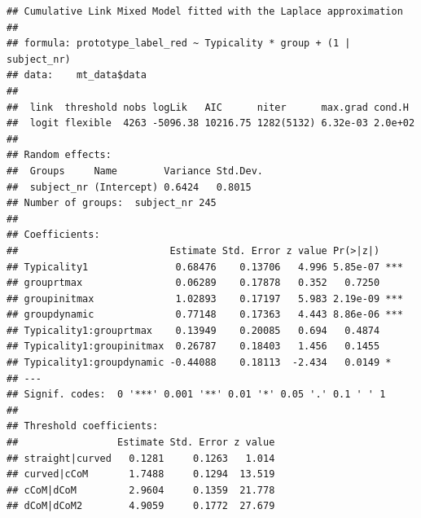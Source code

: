\documentclass[
]{article}
\begin{document}
\begin{verbatim}
## Cumulative Link Mixed Model fitted with the Laplace approximation
## 
## formula: prototype_label_red ~ Typicality * group + (1 | subject_nr)
## data:    mt_data$data
## 
##  link  threshold nobs logLik   AIC      niter      max.grad cond.H 
##  logit flexible  4263 -5096.38 10216.75 1282(5132) 6.32e-03 2.0e+02
## 
## Random effects:
##  Groups     Name        Variance Std.Dev.
##  subject_nr (Intercept) 0.6424   0.8015  
## Number of groups:  subject_nr 245 
## 
## Coefficients:
##                          Estimate Std. Error z value Pr(>|z|)    
## Typicality1               0.68476    0.13706   4.996 5.85e-07 ***
## grouprtmax                0.06289    0.17878   0.352   0.7250    
## groupinitmax              1.02893    0.17197   5.983 2.19e-09 ***
## groupdynamic              0.77148    0.17363   4.443 8.86e-06 ***
## Typicality1:grouprtmax    0.13949    0.20085   0.694   0.4874    
## Typicality1:groupinitmax  0.26787    0.18403   1.456   0.1455    
## Typicality1:groupdynamic -0.44088    0.18113  -2.434   0.0149 *  
## ---
## Signif. codes:  0 '***' 0.001 '**' 0.01 '*' 0.05 '.' 0.1 ' ' 1
## 
## Threshold coefficients:
##                 Estimate Std. Error z value
## straight|curved   0.1281     0.1263   1.014
## curved|cCoM       1.7488     0.1294  13.519
## cCoM|dCoM         2.9604     0.1359  21.778
## dCoM|dCoM2        4.9059     0.1772  27.679
\end{verbatim}
\end{document}
